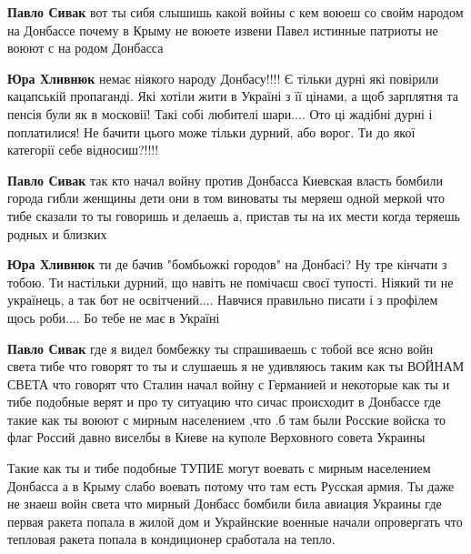 \begin{itemize}
\begin{itemize}
\textbf{Павло Сивак} вот ты сибя слышишь какой войны с кем воюеш со свойм народом на Донбассе почему в Крыму не воюете извени Павел истинные патриоты не воюют с на родом Донбасса

\textbf{Юра Хливнюк} немає ніякого народу Донбасу!!!! Є тільки дурні які повірили кацапській пропаганді. Які хотіли жити в Україні з її цінами, а щоб зарплятня та пенсія були як в московії! Такі собі любителі шари.... Ото ці жадібні дурні і поплатилися! Не бачити цього може тільки дурний, або ворог. Ти до якої категорії себе відносиш?!!!!

\textbf{Павло Сивак} так кто начал войну против Донбасса Киевская власть
бомбили города гибли женщины дети они в том виноваты ты меряеш одной меркой что
тибе сказали то ты говоришь и делаешь а, пристав ты на их мести когда теряешь
родных и близких


\textbf{Юра Хливнюк} ти де бачив "бомбьожкі городов" на Донбасі? Ну тре кінчати
з тобою. Ти настільки дурний, що навіть не помічаєш своєї тупості. Ніякий ти не
українець, а так бот не освітчений.... Навчися правильно писати і з профілем
щось роби.... Бо тебе не має в Україні

\textbf{Павло Сивак} где я видел бомбежку ты спрашиваешь с тобой все ясно войн
света тибе что говорят то ты и слушаешь я не удивляюсь таким как ты ВОЙНАМ
СВЕТА что говорят что Сталин начал войну с Германией и некоторые как ты и тибе
подобные верят и про ту ситуацию что сичас происходит в Донбассе где такие как
ты воюют с мирным населением ,что .б там были Росские войска то флаг Россий
давно виселбы в Киеве на куполе Верховного совета Украины


Такие как ты и тибе подобные ТУПИЕ могут воевать с мирным населением Донбасса а
в Крыму слабо воевать потому что там есть Русская армия. Ты даже не знаеш войн
света что мирный Донбасс бомбили била авиация Украины где первая ракета попала
в жилой дом и Украйнские военные начали опровергать что тепловая ракета попала
в кондиционер сработала на тепло.


\end{itemize}
\end{itemize}
